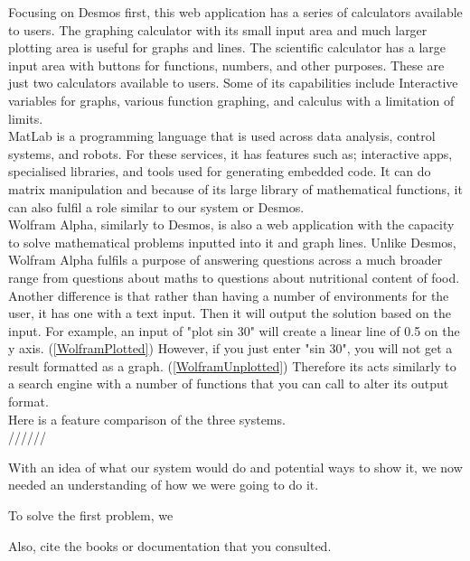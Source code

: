 \documentclass[a4paper, oneside, 11pt]{report}
\begin{document}
	Focusing on Desmos first, this web application has a series of calculators available to users. The graphing calculator with its small input area and much larger plotting area is useful for graphs and lines. The scientific calculator has a large input area with buttons for functions, numbers, and other purposes. These are just two calculators available to users. Some of its capabilities include Interactive variables for graphs, various function graphing, and calculus with a limitation of limits. \\

	MatLab is a programming language that is used across data analysis, control systems, and robots. For these services, it has features such as; interactive apps, specialised libraries, and tools used for generating embedded code. It can do matrix manipulation \citep{Matlab-Feat:2025} and because of its large library of mathematical functions, it can also fulfil a role similar to our system or Desmos. \\

	Wolfram Alpha, similarly to Desmos, is also a web application with the capacity to solve mathematical problems inputted into it and graph lines. Unlike Desmos, Wolfram Alpha fulfils a purpose of answering questions across a much broader range from questions about maths to questions about nutritional content of food. Another difference is that rather than having a number of environments for the user, it has one with a text input. Then it will output the solution based on the input. For example, an input of "plot sin 30" will create a linear line of 0.5 on the y axis. (\ref{WolframPlotted})
	However, if you just enter "sin 30", you will not get a result formatted as a graph. (\ref{WolframUnplotted})
	Therefore its acts similarly to a search engine with a number of functions that you can call to alter its output format. \\

	Here is a feature comparison of the three systems. \\//////

	With an idea of what our system would do and potential ways to show it, we now needed an understanding of how we were going to do it.

	To solve the first problem, we

	Also, cite the books \citep{Nystrom:2021} or documentation \citep{WPF:2023} that you consulted.
\end{document}
